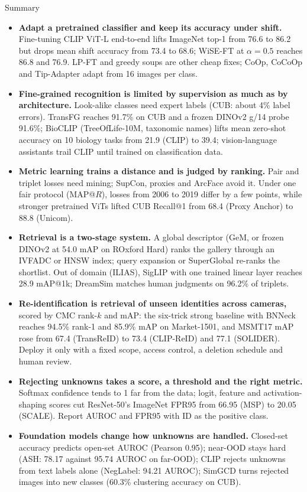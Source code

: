 \begin{frame}[allowframebreaks]{Summary}
  \setlength{\parskip}{0pt}
  \begin{itemize}\scriptsize\itemsep0.2em
    \item \textbf{Adapt a pretrained classifier and keep its accuracy under shift.} Fine-tuning CLIP ViT-L end-to-end lifts ImageNet top-1 from 76.6 to 86.2 but drops mean shift accuracy from 73.4 to 68.6; WiSE-FT at $\alpha=0.5$ reaches 86.8 and 76.9. LP-FT and greedy soups are other cheap fixes; CoOp, CoCoOp and Tip-Adapter adapt from 16 images per class.
    \item \textbf{Fine-grained recognition is limited by supervision as much as by architecture.} Look-alike classes need expert labels (CUB: about 4\% label errors). TransFG reaches 91.7\% on CUB and a frozen DINOv2 g/14 probe 91.6\%; BioCLIP (TreeOfLife-10M, taxonomic names) lifts mean zero-shot accuracy on 10 biology tasks from 21.9 (CLIP) to 39.4; vision-language assistants trail CLIP until trained on classification data.
    \item \textbf{Metric learning trains a distance and is judged by ranking.} Pair and triplet losses need mining; SupCon, proxies and ArcFace avoid it. Under one fair protocol (MAP@$R$), losses from 2006 to 2019 differ by a few points, while stronger pretrained ViTs lifted CUB Recall@1 from 68.4 (Proxy Anchor) to 88.8 (Unicom).
    \item \textbf{Retrieval is a two-stage system.} A global descriptor (GeM, or frozen DINOv2 at 54.0 mAP on ROxford Hard) ranks the gallery through an IVFADC or HNSW index; query expansion or SuperGlobal re-ranks the shortlist. Out of domain (ILIAS), SigLIP with one trained linear layer reaches 28.9 mAP@1k; DreamSim matches human judgments on 96.2\% of triplets.
    \item \textbf{Re-identification is retrieval of unseen identities across cameras,} scored by CMC rank-$k$ and mAP: the six-trick strong baseline with BNNeck reaches 94.5\% rank-1 and 85.9\% mAP on Market-1501, and MSMT17 mAP rose from 67.4 (TransReID) to 73.4 (CLIP-ReID) and 77.1 (SOLIDER). Deploy it only with a fixed scope, access control, a deletion schedule and human review.
    \item \textbf{Rejecting unknowns takes a score, a threshold and the right metric.} Softmax confidence tends to 1 far from the data; logit, feature and activation-shaping scores cut ResNet-50's ImageNet FPR95 from 66.95 (MSP) to 20.05 (SCALE). Report AUROC and FPR95 with ID as the positive class.
    \item \textbf{Foundation models change how unknowns are handled.} Closed-set accuracy predicts open-set AUROC (Pearson 0.95); near-OOD stays hard (ASH: 78.17 against 95.74 AUROC on far-OOD); CLIP rejects unknowns from text labels alone (NegLabel: 94.21 AUROC); SimGCD turns rejected images into new classes (60.3\% clustering accuracy on CUB).
  \end{itemize}
\end{frame}
